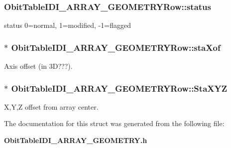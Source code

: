 \subsubsection{ {\bf Obit\-Table\-IDI\_\-ARRAY\_\-GEOMETRYRow::status}}\label{structObitTableIDI__ARRAY__GEOMETRYRow_o13}


status 0=normal, 1=modified, -1=flagged 

\subsubsection{$\ast$ {\bf Obit\-Table\-IDI\_\-ARRAY\_\-GEOMETRYRow::sta\-Xof}}\label{structObitTableIDI__ARRAY__GEOMETRYRow_o12}


Axis offset (in 3D???). 

\subsubsection{$\ast$ {\bf Obit\-Table\-IDI\_\-ARRAY\_\-GEOMETRYRow::Sta\-XYZ}}\label{structObitTableIDI__ARRAY__GEOMETRYRow_o9}


X,Y,Z offset from array center. 



The documentation for this struct was generated from the following file:\begin{CompactItemize}
\item 
{\bf Obit\-Table\-IDI\_\-ARRAY\_\-GEOMETRY.h}\end{CompactItemize}
